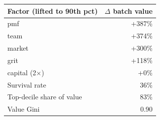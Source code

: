 \begin{tabular}{lr}
\toprule
Factor (lifted to 90th pct) & $\Delta$ batch value \\
\midrule
pmf & +387\% \\
team & +374\% \\
market & +300\% \\
grit & +118\% \\
capital (2$\times$) & +0\% \\
\midrule
Survival rate & 36\% \\
Top-decile share of value & 83\% \\
Value Gini & 0.90 \\
\bottomrule
\end{tabular}
